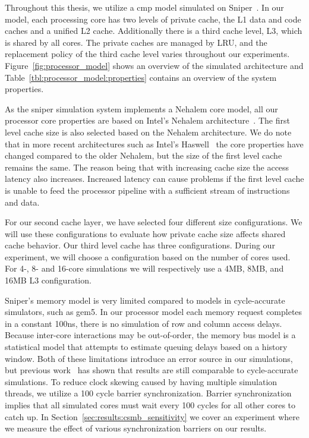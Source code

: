 Throughout this thesis, we utilize a \gls{cmp} model simulated on Sniper~\cite{Carlson2011a}. 
In our model, each processing core has two levels of private cache, the L1 data and code caches and a unified L2 cache.
Additionally there is a third cache level, L3, which is shared by all cores. 
The private caches are managed by LRU, and the replacement policy of the third cache level varies throughout our experiments.
Figure~\ref{fig:processor_model} shows an overview of the simulated architecture and Table~\ref{tbl:processor_model:properties} contains an overview of the system properties.

As the sniper simulation system implements a Nehalem core model, all our processor core properties are based on Intel's Nehalem architecture~\cite{Thomadakis2011}. 
The first level cache size is also selected based on the Nehalem architecture. 
We do note that in more recent architectures such as Intel's Haswell~\cite{Jain2013} the core properties have changed compared to the older Nehalem, but the size of the first level cache remains the same.
The reason being that with increasing cache size the access latency also increases. 
Increased latency can cause problems if the first level cache is unable to feed the processor pipeline with a sufficient stream of instructions and data.

For our second cache layer, we have selected four different size configurations.
We will use these configurations to evaluate how private cache size affects shared cache behavior.
Our third level cache has three configurations.
During our experiment, we will choose a configuration based on the number of cores used.
For 4-, 8- and 16-core simulations we will respectively use a 4MB, 8MB, and 16MB L3 configuration.

Sniper's memory model is very limited compared to models in cycle-accurate simulators, such as gem5.
In our processor model each memory request completes in a constant 100ns, there is no simulation of row and column access delays.
Because inter-core interactions may be out-of-order, the memory bus model is a statistical model that attempts to estimate queuing delays based on a history window.
Both of these limitations introduce an error source in our simulations, but previous work~\cite{Carlson2011a, Olsen2014} has shown that results are still comparable to cycle-accurate simulations.
To reduce clock skewing caused by having multiple simulation threads, we utilize a 100 cycle barrier synchronization.
Barrier synchronization implies that all simulated cores must wait every 100 cycles for all other cores to catch up.
In Section~\ref{sec:results:csmb_sensitivity} we cover an experiment where we measure the effect of various synchronization barriers on our results.

